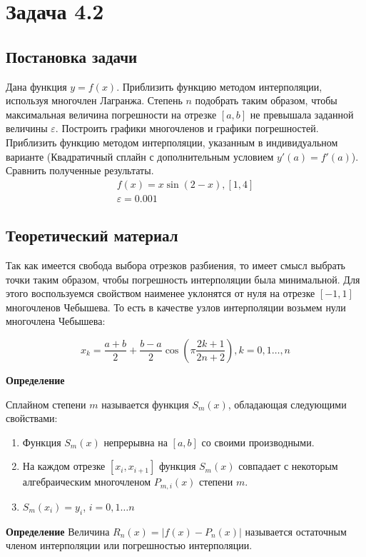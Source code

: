 \section*{Задача 4.2}
\subsection*{Постановка задачи}

Дана функция $y = f(x)$. Приблизить функцию методом интерполяции, используя многочлен Лагранжа. Степень $n$ подобрать таким образом, чтобы максимальная величина погрешности на отрезке $[a, b]$ не превышала заданной величины $\varepsilon$. Построить графики многочленов и графики погрешностей. Приблизить функцию методом интерполяции, указанным в индивидуальном варианте (Квадратичный сплайн с дополнительным условием $y'(a) = f'(a)$). Сравнить полученные результаты.
\begin{gather}
	f(x) = x\sin{(2 - x)}, [1, 4] \\
	\varepsilon = 0.001
\end{gather}
	
\subsection*{Теоретический материал}

Так как имеется свобода выбора отрезков разбиения, то имеет смысл выбрать точки таким образом, чтобы погрешность интерполяции была минимальной. Для этого воспользуемся свойством наименее уклонятся от нуля на отрезке $[-1, 1]$ многочленов Чебышева. То есть в качестве узлов интерполяции возьмем нули многочлена Чебышева:

\[
	x_k = \dfrac{a + b}{2} + \dfrac{b - a}{2}\cos{\left(\pi\dfrac{2k + 1}{2n + 2}\right)}, k = 0, 1\dots, n
\]

\textbf{Определение}{
	Сплайном степени $m$ называется функция $S_m(x)$, обладающая следующими свойствами:
	\begin{enumerate}
		\item Функция $S_m(x)$ непрерывна на $[a, b]$ со своими производными.
		\item На каждом отрезке $[x_i, x_{i+1}]$ функция $S_m(x)$ совпадает с некоторым алгебраическим многочленом $P_{m, i}(x)$ степени $m$.
		\item $S_m(x_i) = y_i$, $i = 0, 1\dots n$
	\end{enumerate}
}

\textbf{Определение}{
	Величина $R_n(x) = |f(x) - P_n(x)|$ называется остаточным членом
интерполяции или погрешностью интерполяции.
}

